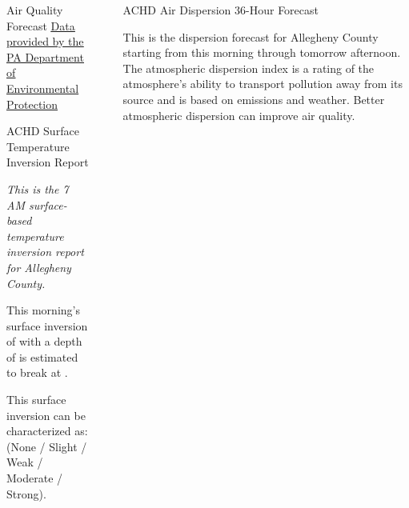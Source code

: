 \documentclass[final, xcolor=table]{beamer}
\newlength{\sepwidth}
\newlength{\colwidth}
\newcommand{\separatorcolumn}{\begin{column}{\sepwidth}\end{column}}
\begin{document}
\begin{frame}[t]
\begin{columns}[t]
\begin{column}{\colwidth}
\begin{block}{Air Quality Forecast}
    \href{https://www.ahs.dep.pa.gov/AQPartnersWeb/forecast_home.aspx}{\underline{Data provided by the PA Department of Environmental Protection}}

  \end{block} 
  

  \begin{block}{ACHD Surface Temperature Inversion Report}

    \textit{This is the 7 AM surface-based temperature inversion report for Allegheny County.}

    This morning’s surface inversion of \underline{\textbf{\Temp}} with a depth of \underline{\textbf{\Depth}} is estimated to break at \underline{\textbf{\Time}}. 
    
    This surface inversion can be characterized as: \underline{\textbf{\Scale}} (None / Slight / Weak / Moderate / Strong). 
    
    \Inversion

  \end{block}

\end{column} 

\separatorcolumn



\begin{column}{\colwidth}


  \begin{block}{ACHD Air Dispersion 36-Hour Forecast}

    This is the dispersion forecast for Allegheny County starting from this morning through tomorrow afternoon. The atmospheric dispersion index is a rating of the atmosphere’s ability to transport pollution away from its source and is based on emissions and weather. Better atmospheric dispersion can improve air quality.


\end{block}
\end{column}
\end{columns}
\end{frame}
\end{document}
